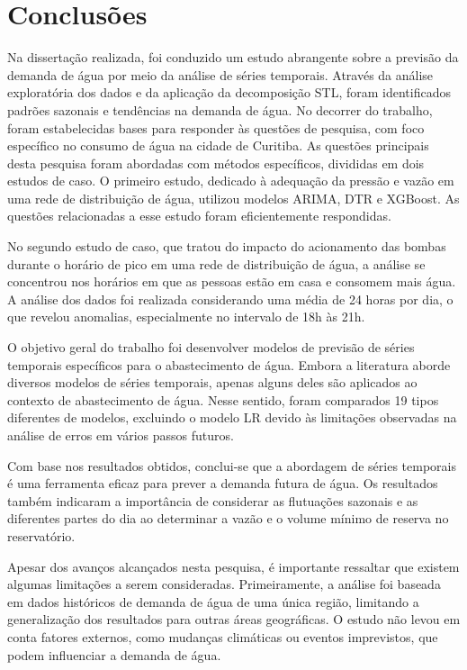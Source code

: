 \section{Conclus\~oes} \label{sec:conclusoes}

Na dissertação realizada, foi conduzido um estudo abrangente sobre a previsão da demanda de água por meio da análise de séries temporais. Através da análise exploratória dos dados e da aplicação da decomposição STL, foram identificados padrões sazonais e tendências na demanda de água.
No decorrer do trabalho, foram estabelecidas bases para responder às questões de pesquisa, com foco específico no consumo de água na cidade de Curitiba. As questões principais desta pesquisa foram abordadas com métodos específicos, divididas em dois estudos de caso. O primeiro estudo, dedicado à adequação da pressão e vazão em uma rede de distribuição de água, utilizou modelos ARIMA, DTR e XGBoost. As questões relacionadas a esse estudo foram eficientemente respondidas.

No segundo estudo de caso, que tratou do impacto do acionamento das bombas durante o horário de pico em uma rede de distribuição de água, a análise se concentrou nos horários em que as pessoas estão em casa e consomem mais água. A análise dos dados foi realizada considerando uma média de 24 horas por dia, o que revelou anomalias, especialmente no intervalo de 18h às 21h.

O objetivo geral do trabalho foi desenvolver modelos de previsão de séries temporais específicos para o abastecimento de água. Embora a literatura aborde diversos modelos de séries temporais, apenas alguns deles são aplicados ao contexto de abastecimento de água. Nesse sentido, foram comparados 19 tipos diferentes de modelos, excluindo o modelo LR devido às limitações observadas na análise de erros em vários passos futuros.

Com base nos resultados obtidos, conclui-se que a abordagem de séries temporais é uma ferramenta eficaz para prever a demanda futura de água. Os resultados também indicaram a importância de considerar as flutuações sazonais e as diferentes partes do dia ao determinar a vazão e o volume mínimo de reserva no reservatório.

Apesar dos avanços alcançados nesta pesquisa, é importante ressaltar que existem algumas limitações a serem consideradas. Primeiramente, a análise foi baseada em dados históricos de demanda de água de uma única região, limitando a generalização dos resultados para outras áreas geográficas. O estudo não levou em conta fatores externos, como mudanças climáticas ou eventos imprevistos, que podem influenciar a demanda de água.





